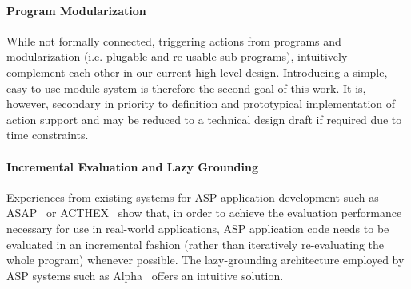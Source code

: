 \paragraph{Program Modularization} While not formally connected, triggering actions from programs and modularization (i.e. plugable and re-usable sub-programs), intuitively complement each other in our current high-level design. Introducing a simple, easy-to-use module system is therefore the second goal of this work. It is, however, secondary in priority to definition and prototypical implementation of action support and may be reduced to a technical design draft if required due to time constraints.

\paragraph{Incremental Evaluation and Lazy Grounding} Experiences from existing systems for ASP application development such as ASAP~\cite{aspetris} or ACTHEX~\cite{acthex} show that, in order to achieve the evaluation performance necessary for use in real-world applications, ASP application code needs to be evaluated in an incremental fashion (rather than iteratively re-evaluating the whole program) whenever possible. The lazy-grounding architecture employed by ASP systems such as Alpha~\cite{alpha} offers an intuitive solution.